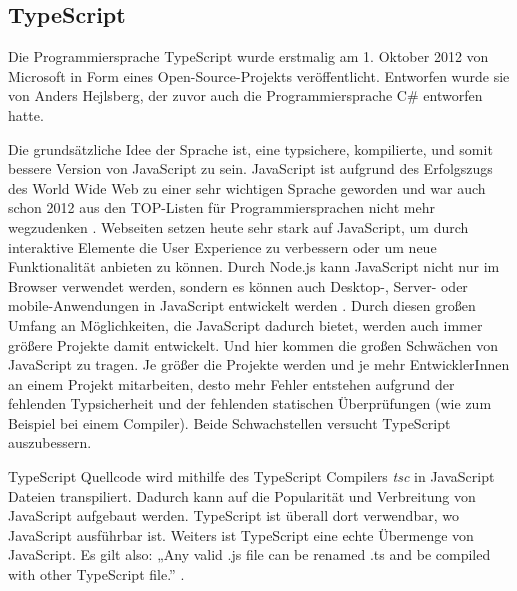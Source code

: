 \subsection{TypeScript}

Die Programmiersprache TypeScript wurde erstmalig am 1. Oktober 2012 
\cite{TypeScriptCodePlexArchived} von 
Microsoft in Form eines Open-Source-Projekts veröffentlicht. Entworfen wurde sie 
von Anders Hejlsberg, der zuvor auch die Programmiersprache C\# entworfen hatte. 

Die grundsätzliche Idee der Sprache ist, eine typsichere, kompilierte, und somit 
bessere Version von JavaScript zu sein. JavaScript ist aufgrund des Erfolgszugs
des World Wide Web zu einer sehr wichtigen Sprache geworden und war auch schon 2012 
aus den TOP-Listen für Programmiersprachen nicht mehr wegzudenken 
\cite{StackOverflowSurvey,TIOBEIndex,PYPL}. 
Webseiten setzen heute sehr stark auf JavaScript, um durch interaktive Elemente 
die User Experience zu verbessern oder um neue Funktionalität anbieten zu können. 
Durch Node.js kann JavaScript nicht nur im Browser 
verwendet werden, sondern es können auch Desktop-, Server- oder mobile-Anwendungen 
in JavaScript entwickelt werden \cite{rozentals2017mastering}.
Durch diesen großen Umfang an Möglichkeiten, die 
JavaScript dadurch bietet, werden auch immer größere Projekte damit entwickelt. 
Und hier kommen die großen Schwächen von JavaScript zu tragen. 
Je größer die Projekte werden und je mehr EntwicklerInnen an einem Projekt 
mitarbeiten, desto mehr Fehler entstehen aufgrund der fehlenden Typsicherheit
und der fehlenden statischen Überprüfungen (wie zum Beispiel bei einem Compiler). 
Beide Schwachstellen versucht TypeScript auszubessern.

TypeScript Quellcode wird mithilfe des TypeScript Compilers \emph{tsc} in JavaScript 
Dateien transpiliert. Dadurch kann auf die Popularität und Verbreitung von JavaScript 
aufgebaut werden. TypeScript ist überall dort verwendbar, wo JavaScript 
ausführbar ist. Weiters ist TypeScript eine echte Übermenge von JavaScript. 
Es gilt also: „Any valid .js file can be renamed .ts and be compiled with other 
TypeScript file.” \cite{MaharryDanTR}. 

